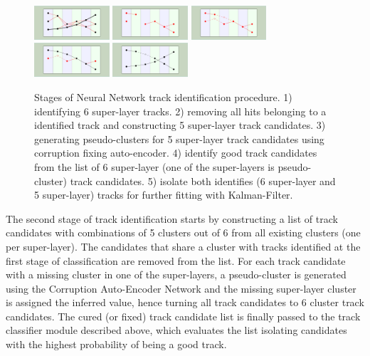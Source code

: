  \begin{figure}[!h]
\begin{center}
 \includegraphics[angle=90,width=1.1in]{images/iden_6_sl.pdf}
  \includegraphics[angle=90,width=1.1in]{images/iden_5_sl_a.pdf}
    \includegraphics[angle=90,width=1.1in]{images/iden_5_sl_b.pdf}
      \includegraphics[angle=90,width=1.1in]{images/iden_5_sl_c.pdf}
            \includegraphics[angle=90,width=1.1in]{images/iden_5_sl_d.pdf}
            
\caption {Stages of Neural Network track identification procedure. 1) identifying 6 super-layer tracks. 2) 
removing all hits belonging to a identified track and constructing 5 super-layer track candidates. 
3) generating pseudo-clusters for 5 super-layer track candidates using corruption fixing auto-encoder. 
4) identify good track candidates from the list of 6 super-layer (one of the super-layers is pseudo-cluster) 
track candidates. 5) isolate both identifies (6 super-layer and 5 super-layer) tracks  for further fitting with 
Kalman-Filter.}
 \label{network:procedure}
 \end{center}
\end{figure}

The second stage of track identification starts by constructing a list of track candidates with combinations 
of 5 clusters out of 6 from all existing clusters (one per super-layer). The candidates that share a cluster with 
tracks identified at the first stage of classification are removed from the list. For each track candidate with a 
missing cluster in one of the super-layers, a pseudo-cluster is generated using the Corruption Auto-Encoder 
Network and the missing super-layer cluster is assigned the inferred value, hence turning all track candidates 
to 6 cluster track candidates. The cured (or fixed) track candidate list is finally passed to the track classifier 
module described above, which evaluates the list isolating candidates with the highest probability of being a 
good track. 

